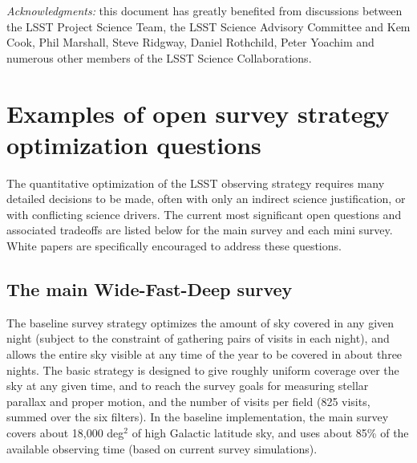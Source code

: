 \documentclass[DM,lsstdraft,toc,usenatbib]{lsstdoc}
\begin{document}
\vskip 0.2in 
{\it Acknowledgments:} this document has greatly benefited from discussions between 
the LSST Project Science Team, the LSST Science Advisory Committee and Kem Cook, 
Phil Marshall, Steve Ridgway, Daniel Rothchild, Peter Yoachim and numerous other members 
of the LSST Science Collaborations. 

\newpage
\appendix
\section{Examples of open survey strategy optimization questions} 

The quantitative optimization of the LSST observing strategy requires many 
detailed decisions to be made, often with only an indirect science justification,
or with conflicting science drivers.  The current most significant open questions and associated 
tradeoffs are listed below for the main survey and each mini survey. White papers are specifically 
encouraged to address these questions.


\subsection{The main Wide-Fast-Deep survey} 

The baseline survey strategy optimizes the amount of sky covered in any given night (subject to 
the constraint of gathering pairs of visits in each night), 
and allows the entire sky visible at any time of the year to be covered in about three nights. 
The basic strategy is designed to give roughly uniform coverage over the sky at any given time, and to reach
the survey goals for measuring stellar parallax and proper motion, and the number of visits per 
field (825 visits, summed over the six filters). In the baseline implementation, the main survey 
covers about 18,000 deg$^2$ of high Galactic latitude sky, and uses about 85\% of the available 
observing time (based on current survey simulations). 
\end{document}
